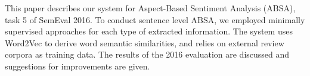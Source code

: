 This paper describes our system for Aspect-Based Sentiment Analysis (ABSA), task 5 of SemEval 2016. To conduct sentence level ABSA, we employed minimally supervised approaches for each type of extracted information. The system uses Word2Vec to derive word semantic similarities, and relies on external review corpora as training data. The results of the 2016 evaluation are discussed and suggestions for improvements are given.
